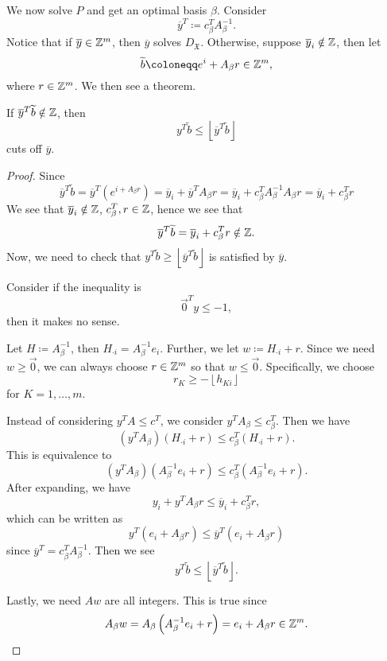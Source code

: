 We now solve \(P\) and get an optimal basis \(\beta\). Consider
\[
	\overline{y}^{T}\coloneqq c_{\beta}^{T}A^{-1}_{\beta}.
\]
Notice that if \(\overline{y}\in\mathbb{\MakeUppercase{Z}}^m\), then \(\overline{y}\) solves \(D_{\mathfrak{X}}\). Otherwise, suppose
\(\overline{y}_{i}\notin \mathbb{\MakeUppercase{Z}}\), then let
\[
	\widetilde{b}\coloneqq e^i + A_{\beta}r\in\mathbb{\MakeUppercase{Z}}^m,
\]
where \(r\in\mathbb{\MakeUppercase{Z}}^m\). We then see a theorem.
\begin{theorem}
	If \(\overline{y}^{T}\widetilde{b}\notin \mathbb{\MakeUppercase{Z}}\), then
	\[
		y^{T}\widetilde{b}\leq \left\lfloor \overline{y}^{T}\widetilde{b} \right\rfloor
	\]
	cuts off \(\overline{y}\).
\end{theorem}
\begin{proof}
	Since
	\[
		\overline{y}^{T}\widetilde{b} = \overline{y}^{T}(e^{i+A_{\beta}r}) = \overline{y}_{i} + \overline{y}^{T}A_{\beta}r = \overline{y}_{i}+c_{\beta}^{T}A^{-1}_{\beta}A_{\beta}r = \overline{y}_{i}+c^{T}_{\beta}r
	\]
	We see that \(\overline{y}_{i}\notin\mathbb{\MakeUppercase{Z}}\), \(c_{\beta}^{T}, r\in \mathbb{\MakeUppercase{Z}}\), hence we see that
	\[
		\overline{y}^{T}\widetilde{b} = \overline{y}_{i}+c^{T}_{\beta}r\notin \mathbb{\MakeUppercase{Z}}.
	\]
	Now, we need to check that \(y^{T}\widetilde{b}\geq \left\lfloor \overline{y}^{T}\widetilde{b} \right\rfloor\) is satisfied by \(\overline{y}\).

	\hr
	\begin{intuition}
		Consider if the inequality is
		\[
			\vec{0}^{T}y\leq -1,
		\]
		then it makes no sense.
	\end{intuition}
	\hr

	Let \(H\coloneqq A^{-1}_{\beta}\), then \(H_{\cdot i} = A^{-1}_{\beta}e_{i}\). Further, we let \(w\coloneqq H_{\cdot i}+r\). Since we need
	\(w\geq \vec{0}\), we can always choose \(r\in \mathbb{\MakeUppercase{Z}}^m\) so that \(w\leq \vec{0}\). Specifically, we choose
	\[
		r_K \geq -\left\lfloor h_{Ki} \right\rfloor
	\] for \(K = 1, \ldots , m\).

	Instead of considering \(y^{T}A\leq c^{T}\), we consider \(y^{T}A_{\beta}\leq c_{\beta}^{T}\). Then we have
	\[
		\left(y^{T}A_{\beta}\right)\left(H_{\cdot i}+r\right) \leq c_{\beta}^{T}\left(H_{\cdot i}+r\right).
	\]
	This is equivalence to
	\[
		\left(y^{T}A_{\beta}\right)\left(A^{-1}_{\beta}e_{i}+r\right) \leq c_{\beta}^{T}\left(A^{-1}_{\beta}e_{i}+r\right).
	\]
	After expanding, we have
	\[
		y_{i}+y^{T}A_{\beta}r\leq \overline{y}_{i}+c_{\beta}^{T}r,
	\]
	which can be written as
	\[
		y^{T}\left(e_{i}+A_{\beta}r\right) \leq \overline{y}^{T}\left(e_{i}+A_{\beta}r\right)
	\]
	since \(\overline{y}^{T} = c_{\beta}^{T}A^{-1}_{\beta}\). Then we see
	\[
		y^{T}\widetilde{b}\leq \left\lfloor \overline{y}^{T}\widetilde{b} \right\rfloor.
	\]

	Lastly, we need \(Aw\) are all integers. This is true since
	\[
		A_{\beta}w = A_{\beta}\left(A^{-1}_{\beta}e_{i}+r\right) = e_{i}+A_{\beta}r \in \mathbb{\MakeUppercase{Z}}^m.
	\]
\end{proof}

